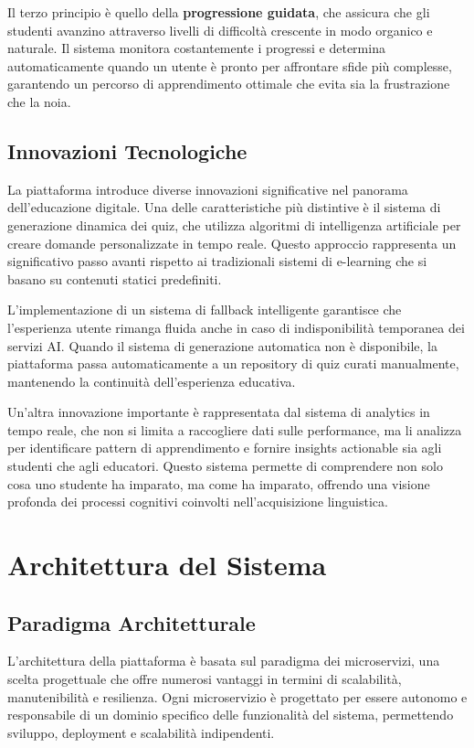 \documentclass[12pt,a4paper]{article}
\begin{document}
Il terzo principio è quello della \textbf{progressione guidata}, che assicura che gli studenti avanzino attraverso livelli di difficoltà crescente in modo organico e naturale. Il sistema monitora costantemente i progressi e determina automaticamente quando un utente è pronto per affrontare sfide più complesse, garantendo un percorso di apprendimento ottimale che evita sia la frustrazione che la noia.

\subsection{Innovazioni Tecnologiche}

La piattaforma introduce diverse innovazioni significative nel panorama dell'educazione digitale. Una delle caratteristiche più distintive è il sistema di generazione dinamica dei quiz, che utilizza algoritmi di intelligenza artificiale per creare domande personalizzate in tempo reale. Questo approccio rappresenta un significativo passo avanti rispetto ai tradizionali sistemi di e-learning che si basano su contenuti statici predefiniti.

L'implementazione di un sistema di fallback intelligente garantisce che l'esperienza utente rimanga fluida anche in caso di indisponibilità temporanea dei servizi AI. Quando il sistema di generazione automatica non è disponibile, la piattaforma passa automaticamente a un repository di quiz curati manualmente, mantenendo la continuità dell'esperienza educativa.

Un'altra innovazione importante è rappresentata dal sistema di analytics in tempo reale, che non si limita a raccogliere dati sulle performance, ma li analizza per identificare pattern di apprendimento e fornire insights actionable sia agli studenti che agli educatori. Questo sistema permette di comprendere non solo cosa uno studente ha imparato, ma come ha imparato, offrendo una visione profonda dei processi cognitivi coinvolti nell'acquisizione linguistica.

\section{Architettura del Sistema}

\subsection{Paradigma Architetturale}

L'architettura della piattaforma è basata sul paradigma dei microservizi, una scelta progettuale che offre numerosi vantaggi in termini di scalabilità, manutenibilità e resilienza. Ogni microservizio è progettato per essere autonomo e responsabile di un dominio specifico delle funzionalità del sistema, permettendo sviluppo, deployment e scalabilità indipendenti.
\end{document}
